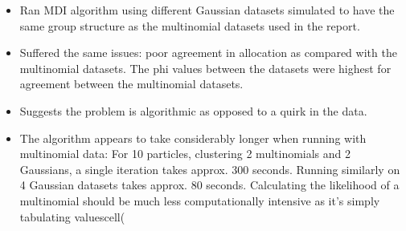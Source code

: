 \documentclass[10pt,a4paper]{report}
\begin{document}
\begin{itemize}
\item Ran MDI algorithm using different Gaussian datasets simulated to have the same group structure as the multinomial datasets used in the report.
\item Suffered the same issues: poor agreement in allocation as compared with the multinomial datasets. The phi values between the datasets were highest for agreement between the multinomial datasets.
\item Suggests the problem is algorithmic as opposed to a quirk in the data.
\item The algorithm appears to take considerably longer when running with multinomial data: For 10 particles, clustering 2 multinomials and 2 Gaussians, a single iteration takes approx. 300 seconds. Running similarly on 4 Gaussian datasets takes approx. 80 seconds. Calculating the likelihood of a multinomial should be much less computationally intensive as it's simply tabulating valuescell(
\end{itemize}
\end{document}
